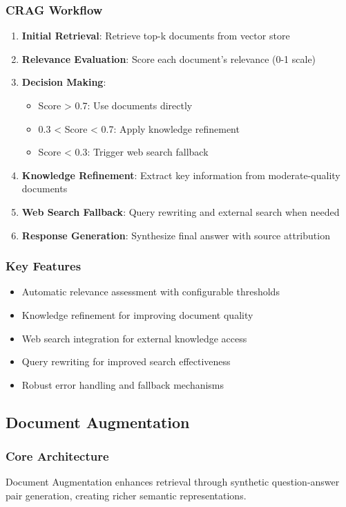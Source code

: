\documentclass[12pt,a4paper]{article}
\begin{document}
\subsubsection{CRAG Workflow}
\begin{enumerate}
    \item \textbf{Initial Retrieval}: Retrieve top-k documents from vector store
    \item \textbf{Relevance Evaluation}: Score each document's relevance (0-1 scale)
    \item \textbf{Decision Making}:
    \begin{itemize}
        \item Score > 0.7: Use documents directly
        \item 0.3 < Score < 0.7: Apply knowledge refinement
        \item Score < 0.3: Trigger web search fallback
    \end{itemize}
    \item \textbf{Knowledge Refinement}: Extract key information from moderate-quality documents
    \item \textbf{Web Search Fallback}: Query rewriting and external search when needed
    \item \textbf{Response Generation}: Synthesize final answer with source attribution
\end{enumerate}

\subsubsection{Key Features}
\begin{itemize}
    \item Automatic relevance assessment with configurable thresholds
    \item Knowledge refinement for improving document quality
    \item Web search integration for external knowledge access
    \item Query rewriting for improved search effectiveness
    \item Robust error handling and fallback mechanisms
\end{itemize}

\subsection{Document Augmentation}

\subsubsection{Core Architecture}
Document Augmentation enhances retrieval through synthetic question-answer pair generation, creating richer semantic representations.
\end{document}
